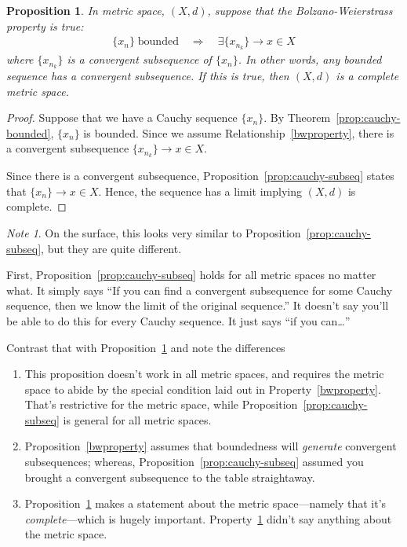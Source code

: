 \documentclass[12pt]{book}
\numberwithin{equation}{section} %
\theoremstyle{plain}
\newtheorem{prop}[thm]{Proposition}
\theoremstyle{definition}
\theoremstyle{remark}
\newtheorem*{note}{Note}
\begin{document}
\begin{prop}
\label{prop:bwproperty}
In metric space, $(X,d)$,
suppose that the \emph{Bolzano-Weierstrass} property is true:
\begin{align}
  \label{bwproperty}
  \{x_n\} \;\text{bounded}
  \quad\Rightarrow\quad
  \exists \{x_{n_k}\}\rightarrow x \in X
\end{align}
where $\{x_{n_k}\}$ is a convergent subsequence of $\{x_n\}$.  In other
words, any bounded sequence has a convergent subsequence. If this is
true, then $(X,d)$ is a complete metric space.
\end{prop}
\begin{proof}
Suppose that we have a Cauchy sequence $\{x_n\}$. By
Theorem~\ref{prop:cauchy-bounded}, $\{x_n\}$ is bounded. Since we assume
Relationship~\ref{bwproperty}, there is a convergent subsequence
$\{x_{n_k}\}\rightarrow x \in X$.

Since there is a convergent subsequence,
Proposition~\ref{prop:cauchy-subseq} states that $\{x_n\}\rightarrow
x\in X$. Hence, the sequence has a limit implying $(X,d)$ is complete.
\end{proof}

\begin{note}
On the surface, this looks very similar to
Proposition~\ref{prop:cauchy-subseq}, but they are quite different.

First, Proposition~\ref{prop:cauchy-subseq} holds for all metric spaces
no matter what. It simply says ``If you can find a convergent
subsequence for some Cauchy sequence, then we know the limit of the
original sequence.'' It doesn't say you'll be able to do this for every
Cauchy sequence. It just says ``if you can\ldots''

Contrast that with Proposition~\ref{prop:bwproperty} and note the
differences
\begin{enumerate}
  \item This proposition doesn't work in all metric spaces, and requires
    the metric space to abide by the special condition laid out in
    Property~\ref{bwproperty}. That's restrictive for the metric space,
    while Proposition~\ref{prop:cauchy-subseq} is general for all metric
    spaces.
  \item Proposition~\ref{bwproperty} assumes that boundedness
    will \emph{generate} convergent subsequences; whereas,
    Proposition~\ref{prop:cauchy-subseq} assumed you brought a
    convergent subsequence to the table straightaway.
  \item Proposition~\ref{prop:bwproperty} makes a statement about the
    metric space---namely that it's \emph{complete}---which is hugely
    important. Property~\ref{prop:bwproperty} didn't say anything about
    the metric space.
\end{enumerate}
\end{note}
\end{document}

